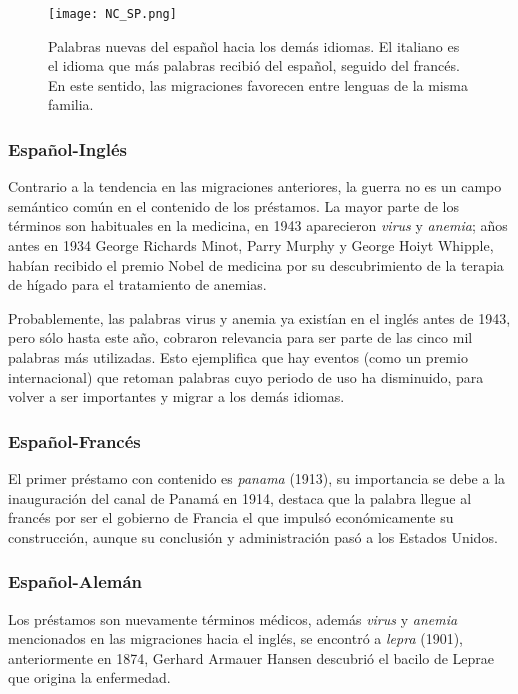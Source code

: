 \begin{figure} %
	\centering
	\texttt{[image: NC\_SP.png]}
	\label{fig.NC_SP}
	\caption{Palabras nuevas del español hacia los demás idiomas. El italiano es el idioma  que más palabras recibió del español, seguido del francés. En este sentido, las migraciones favorecen entre lenguas de la misma familia.}
\end{figure} %

\subsubsection*{Español-Inglés}%

Contrario a la tendencia en las migraciones anteriores, la guerra no es un campo semántico común en el contenido de los préstamos. La mayor parte de los términos son habituales en la medicina,  en 1943  aparecieron  \textit{virus} y \textit{anemia};  años antes en 1934 George Richards Minot, Parry Murphy y George Hoiyt Whipple, habían recibido el premio Nobel de medicina por su descubrimiento de la terapia de hígado para el tratamiento de anemias.   

Probablemente, las palabras virus y anemia ya existían en el inglés antes de 1943,  pero sólo hasta este año,  cobraron relevancia para ser parte de las cinco mil palabras más utilizadas. Esto ejemplifica que hay eventos (como un premio internacional) que retoman palabras cuyo periodo de uso  ha disminuido,  para volver a ser importantes y migrar a los demás idiomas.


\subsubsection*{Español-Francés}%

El primer préstamo con contenido es \textit{panama} (1913), su importancia se debe a la inauguración del canal de Panamá en 1914, destaca que la palabra llegue al francés por ser el gobierno de Francia el que impulsó económicamente su construcción, aunque su conclusión y administración pasó a los Estados Unidos.  




\subsubsection*{Español-Alemán}


Los préstamos son nuevamente términos médicos, además \textit{virus} y \textit{anemia} mencionados en las migraciones hacia el inglés, se encontró a \textit{lepra} (1901), anteriormente en 1874, Gerhard Armauer Hansen descubrió el bacilo de Leprae que origina la enfermedad.


